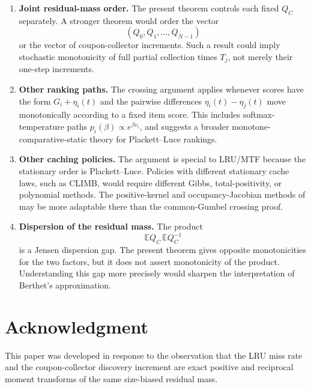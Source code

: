 \documentclass[11pt]{article}
\newcommand{\E}{\mathbb E}
\newcommand{\1}{\mathbf 1}
\begin{document}
\begin{enumerate}[label=(\arabic*)]
\item \textbf{Joint residual-mass order.}  The present theorem controls each fixed
$Q_C$ separately.  A stronger theorem would order the vector
\[
        (Q_0,Q_1,\ldots,Q_{N-1})
\]
or the vector of coupon-collector increments.  Such a result could imply stochastic
monotonicity of full partial collection times $T_j$, not merely their one-step increments.

\item \textbf{Other ranking paths.}  The crossing argument applies whenever scores have
the form $G_i+\eta_i(t)$ and the pairwise differences $\eta_i(t)-\eta_j(t)$ move
monotonically according to a fixed item score.  This includes softmax-temperature paths
$p_i(\beta)\propto e^{\beta v_i}$, and suggests a broader monotone-comparative-static
theory for Plackett--Luce rankings.

\item \textbf{Other caching policies.}  The argument is special to LRU/MTF because the
stationary order is Plackett--Luce.  Policies with different stationary cache laws, such
as CLIMB, would require different Gibbs, total-positivity, or polynomial methods.  The
positive-kernel and occupancy-Jacobian methods of \cite{LongLRU2026} may be more
adaptable there than the common-Gumbel crossing proof.

\item \textbf{Dispersion of the residual mass.}  The product
\[
        \E Q_C\,\E Q_C^{-1}
\]
is a Jensen dispersion gap.  The present theorem gives opposite monotonicities for the
two factors, but it does not assert monotonicity of the product.  Understanding this gap
more precisely would sharpen the interpretation of Berthet's approximation.
\end{enumerate}

\section*{Acknowledgment}
This paper was developed in response to the observation that the LRU miss rate and the
coupon-collector discovery increment are exact positive and reciprocal moment transforms
of the same size-biased residual mass.
\end{document}
